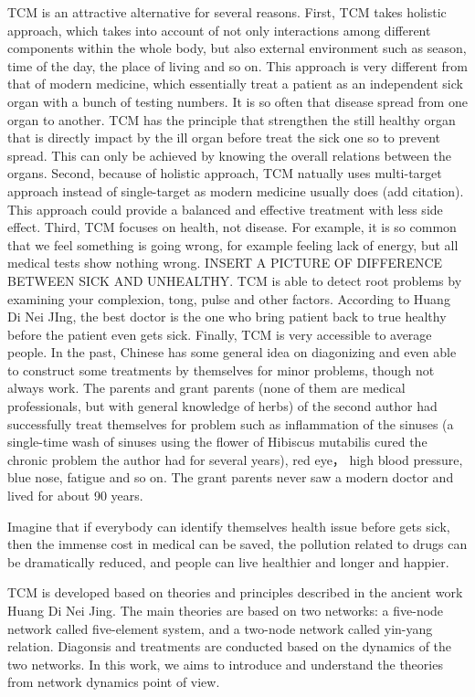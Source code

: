 \documentclass{article}
\begin{document}
TCM is an attractive alternative for several reasons.
First, TCM takes holistic approach, which takes into account of not only interactions among different components within the whole body, but also external environment such as season, time of the day, the place of living and so on. This approach is very different from that of modern medicine, which essentially treat a patient as an independent sick organ with a bunch of testing numbers. It is so often that disease spread from one organ to another. TCM has the principle that strengthen the still healthy organ that is directly impact by the ill organ before treat the sick one so to prevent spread. This can only be achieved by knowing the overall relations between the organs. Second, because of holistic approach, TCM natually uses multi-target approach instead of single-target as  modern medicine usually does (add citation). This approach could provide a balanced and effective treatment with less side effect. Third, TCM focuses on health, not disease. For example, it is so common that we feel something is going wrong, for example feeling lack of energy, but all medical tests show nothing wrong. INSERT A PICTURE OF DIFFERENCE BETWEEN SICK AND UNHEALTHY. TCM is able to detect root problems by examining your complexion, tong, pulse and other factors. According to Huang Di Nei JIng, the best doctor is the one who  bring patient back to true healthy before the patient even gets sick. 
Finally,  TCM  is very  accessible to average people. In the past, Chinese has some general idea on diagonizing and even able to construct some treatments by themselves for minor problems, though not always work.  The parents and grant parents (none of them are medical professionals, but with general knowledge of herbs) of the second author had successfully treat themselves for problem
such as inflammation of the sinuses (a single-time wash of sinuses using the flower of Hibiscus mutabilis cured the chronic problem the author had for several years), red eye， high blood pressure, blue nose,  fatigue and so on.  The grant parents never saw a modern doctor and lived for about 90 years.  

Imagine that if everybody can identify themselves health issue before gets sick, then the immense cost in medical can be saved,  the pollution related to drugs can be dramatically reduced, and  people can live healthier and longer and happier.

TCM is developed based on theories and principles described in the ancient work Huang Di Nei Jing. The main theories are based on two networks: a five-node network called five-element system, and a two-node network called yin-yang relation.  Diagonsis and treatments are conducted based on the dynamics of the two networks.  In this work, we aims to introduce and understand the theories from network dynamics point of view. 
\end{document}
